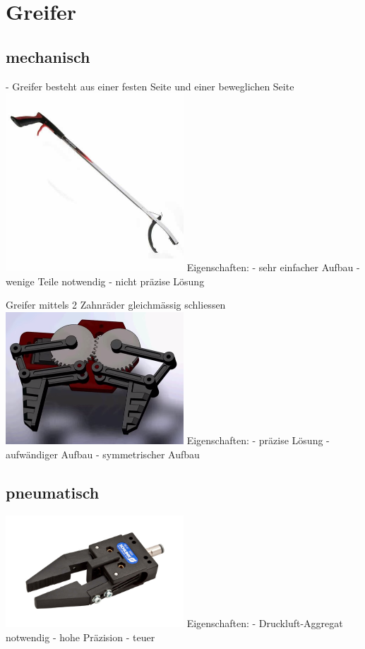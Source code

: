 \section{Greifer}
\subsection{mechanisch}
- Greifer besteht aus einer festen Seite und einer beweglichen Seite
\includegraphics[width=0.5\textwidth]{Images/Gripper 6.png}
Eigenschaften: 
- sehr einfacher Aufbau
- wenige Teile notwendig
- nicht präzise Lösung

Greifer mittels 2 Zahnräder gleichmässig schliessen
\includegraphics[width=0.5\textwidth]{Images/Gripper 2.png}
Eigenschaften:
- präzise Lösung
- aufwändiger Aufbau
- symmetrischer Aufbau

\subsection{pneumatisch}
\includegraphics[width=0.5\textwidth]{Images/pneumatGr_schunk.jpg}
Eigenschaften: 
- Druckluft-Aggregat notwendig
- hohe Präzision
- teuer

